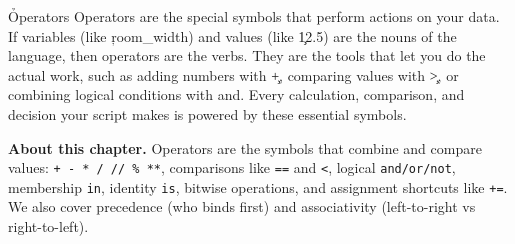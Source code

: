 
\h{Operators}
Operators are the special symbols that perform actions on your data. If variables (like \c{room_width}) and values (like \c{12.5}) are the nouns of the language, then operators are the verbs. They are the tools that let you do the actual work, such as adding numbers with \c{+}, comparing values with \c{>}, or combining logical conditions with and. Every calculation, comparison, and decision your script makes is powered by these essential symbols.
\medskip
\begin{NoteBox}
\textbf{About this chapter.} Operators are the symbols that combine and compare values:
\texttt{+ - * / // \% **}, comparisons like \texttt{==} and \texttt{<}, logical \texttt{and/or/not},
membership \texttt{in}, identity \texttt{is}, bitwise operations, and assignment shortcuts like \texttt{+=}.
We also cover precedence (who binds first) and associativity (left-to-right vs right-to-left).
\end{NoteBox}
\medskip

\begin{tcolorbox}[%
    title=Focus of this chapter:,
    colframe=orange,
    colback = white,
    arc=2mm %
 ]
\end{tcolorbox}

